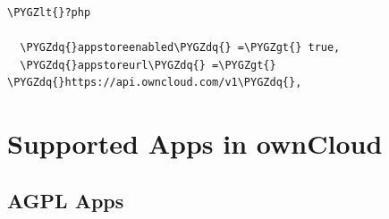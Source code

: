 \documentclass[letterpaper,10pt,english]{sphinxmanual}
\def\PYGZlt{\char`\<}
\def\PYGZgt{\char`\>}
\def\PYGZdq{\char`\"}
\begin{document}
\begin{Verbatim}[commandchars=\\\{\}]
\PYGZlt{}?php

  \PYGZdq{}appstoreenabled\PYGZdq{} =\PYGZgt{} true,
  \PYGZdq{}appstoreurl\PYGZdq{} =\PYGZgt{} \PYGZdq{}https://api.owncloud.com/v1\PYGZdq{},
\end{Verbatim}


\section{Supported Apps in ownCloud}
\label{installation/apps_supported::doc}\label{installation/apps_supported:supported-apps-in-owncloud}

\subsection{AGPL Apps}
\end{document}
